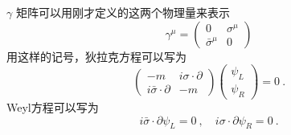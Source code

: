 $\gamma$ 矩阵可以用刚才定义的这两个物理量来表示
\begin{equation}
\gamma^\mu = \begin{pmatrix}
0 & \sigma^\mu \\
\bar \sigma^\mu & 0 
\end{pmatrix}
\end{equation}
用这样的记号，狄拉克方程可以写为
\begin{equation}
\begin{pmatrix}
-m & i \sigma \cdot \partial \\
i \bar \sigma \cdot \partial & -m 
\end{pmatrix}\begin{pmatrix}
\psi_L \\ \psi_R
\end{pmatrix} = 0~.
\end{equation}
Weyl方程可以写为
\begin{equation}
i \bar \sigma \cdot \partial \psi_L = 0~, \quad i \sigma \cdot \partial \psi_R = 0~.
\end{equation}

